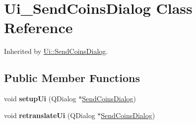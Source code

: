 \hypertarget{class_ui___send_coins_dialog}{}\section{Ui\+\_\+\+Send\+Coins\+Dialog Class Reference}
\label{class_ui___send_coins_dialog}


Inherited by \mbox{\hyperlink{class_ui_1_1_send_coins_dialog}{Ui\+::\+Send\+Coins\+Dialog}}.

\subsection*{Public Member Functions}
\begin{DoxyCompactItemize}
\item 
\mbox{\label{class_ui___send_coins_dialog_aaf674222f4b6a1733df33b04781a8563}} 
void {\bfseries setup\+Ui} (Q\+Dialog $\ast$\mbox{\hyperlink{class_send_coins_dialog}{Send\+Coins\+Dialog}})
\item 
\mbox{\label{class_ui___send_coins_dialog_a940725b8e67b79262d72b02cb615c725}} 
void {\bfseries retranslate\+Ui} (Q\+Dialog $\ast$\mbox{\hyperlink{class_send_coins_dialog}{Send\+Coins\+Dialog}})
\end{DoxyCompactItemize}
